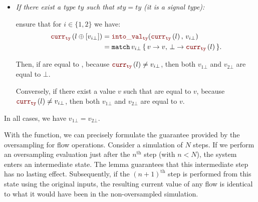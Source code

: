 \begin{skippableproof}
\begin{itemize}
              Then, if  are equal to \none, then both
              $v_{1\bot}$ and $v_{2\bot}$ are equal to $\bot$.

              Conversely, if there exist a value $v$ such that
               are equal to , then both
              $v_{1\bot}$ and $v_{2\bot}$ are equal to $v$.

        \item \textit{If there exist a type $ty$ such that $sty = ty$ (\ie it is a signal type):}

               ensure that for
              $i \in \{1,2\}$ we have:
              \begin{align*}
                  \CurrVal{ty}{l \lstconcat [v_{i\bot}]} & = \intoVal{ty}{\CurrVal{ty}{l}}{v_{i\bot}}                                                      \\
                                                         & = \ttf{match} \, v_{i\bot} \, \{ \, v \rightarrow v, \, \bot \rightarrow \CurrVal{ty}{l} \, \}.
              \end{align*}

              Then, if  are equal to , because
              $\CurrVal{ty}{l} \neq v_{i\bot}$, then both $v_{1\bot}$ and $v_{2\bot}$ are equal to
              $\bot$.

              Conversely, if there exist a value $v$ such that 
              are equal to $v$, because $\CurrVal{ty}{l} \neq v_{i\bot}$, then both $v_{1\bot}$ and
              $v_{2\bot}$ are equal to $v$.
    \end{itemize}

    In all cases, we have $v_{1\bot} = v_{2\bot}$.
\end{skippableproof}

With the  function, we can precisely formulate the guarantee provided by the oversampling
 for flow operations. Consider a simulation of
$N$ steps. If we perform an oversampling evaluation just after the $n^\text{th}$ step
(with $n < N$), the system enters an intermediate state. The lemma guarantees that this intermediate
step has no lasting effect. Subsequently, if the $(n+1)^\text{th}$ step is performed from this state
using the original inputs, the resulting current value of any flow is identical to what it would
have been in the non-oversampled simulation.

